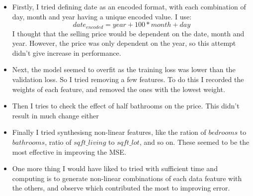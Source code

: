 \documentclass{article}
\begin{document}
\begin{itemize}
\item Firstly, I tried defining date as an encoded format, with each combination of day, month and year having a unique encoded value. I use:
\begin{equation}
date_{encoded} = year + 100*month + day
\end{equation}
I thought that the selling price would be dependent on the date, month and year. However, the price was only dependent on the year, so this attempt didn't give increase in performance.
\item Next, the model seemed to overfit as the training loss was lower than the validation loss. So I tried removing a few features. To do this I recorded the weights of each feature, and removed the ones with the lowest weight. 
\item Then I tries to check the effect of half bathrooms on the price. This didn't result in much change either
\item Finally I tried synthesisng non-linear features, like the ration of $bedrooms$ to $bathrooms$, ratio of $sqft\_living$ to $sqft\_lot$, and so on. These seemed to be the most effective in improving the MSE.
\item One more thing I would have liked to tried with sufficient time and computing is to generate non-linear combinations of each data feature with the others, and observe which contributed the most to improving error.
\end{itemize}
\end{document}
